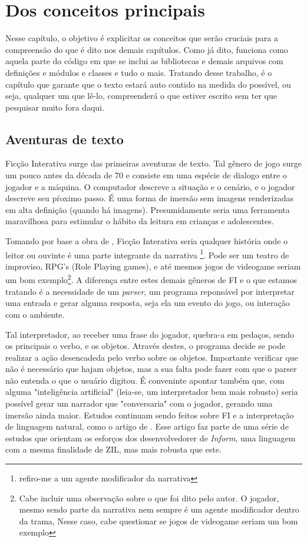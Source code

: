 \chapter{Dos conceitos principais}
\label{cap:main-concepts}

Nesse capítulo, o objetivo é explicitar os conceitos que serão cruciais para a
compreensão do que é dito nos demais capítulos. Como já dito, funciona como
aquela parte do código em que se inclui as bibliotecas e demais arquivos com
definições e módulos e classes e tudo o mais. Tratando desse trabalho, é o
capítulo que garante que o texto estará auto contido na medida do possível, ou
seja, qualquer um que lê-lo, compreenderá o que estiver escrito sem ter que
pesquisar muito fora daqui.

\section{Aventuras de texto}
\label{sec:text-adventure}

Ficção Interativa surge \citep{IF2} das primeiras aventuras de texto. Tal gênero
de jogo surge um pouco antes da década de 70 e consiste em uma espécie de dialogo
entre o jogador e a máquina. O computador descreve a situação e o cenário, e o
jogador descreve seu pŕoximo passo. É uma forma de imersão sem imagens
renderizadas em alta definição (quando há imagens). Presumidamente seria uma
ferramenta maravilhosa para estimular o hábito da leitura em crianças e
adolescentes.

Tomando por base a obra de \citep{Jim:06}, Ficção Interativa seria qualquer
história onde o leitor ou ouvinte é uma parte integrante da narrativa
\footnote{refiro-me a um agente modificador da narrativa}. Pode ser um teatro de
improviso, RPG's (Role Playing games), e até mesmos jogos de videogame seriam um
bom exemplo\footnote{Cabe incluir uma observação sobre o que foi dito pelo autor.
O jogador, mesmo sendo parte da narrativa nem sempre é um agente modificador
dentro da trama, Nesse caso, cabe questionar se jogos de videogame seriam um bom
exemplo}. A diferença entre estes demais gêneros de FI e o que estamos tratando é
a necessidade de um \emph{parser}, um programa reponsável por interpretar uma
entrada e gerar alguma resposta, seja ela um evento do jogo, ou interação com o
ambiente.

Tal interpretador, ao receber uma frase do jogador, quebra-a em pedaços, sendo
os principais o verbo, e os objetos. Através destes, o programa decide se pode
realizar a ação desencadeda pelo verbo sobre os objetos. Importante verificar
que não é necessário que hajam objetos, mas a sua falta pode fazer com que o
parser não entenda o que o usuário digitou. É conveninte apontar também que, com
alguma "inteligência artificial" (leia-se, um interpretador bem mais robusto)
seria possível gerar um narrador que "conversaria" com o jogador, gerando uma
imersão ainda maior. Estudos continuam sendo feitos sobre FI e a interpretação
de linguagem natural, como o artigo de \citep{Nel:06}. Esse artigo faz parte de
uma série de estudos que orientam os esforços dos desenvolvedorer de
\emph{Inform}, uma linguagem com a mesma finalidade de ZIL, mas mais robusta
que este.

